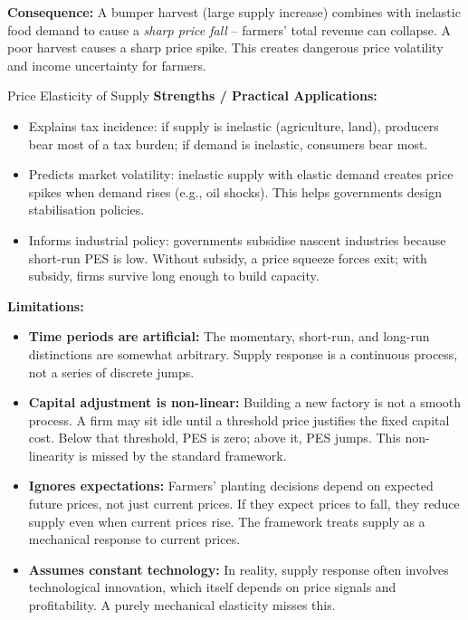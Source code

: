 \documentclass[11pt, a4paper, twoside]{book}
\begin{document}
\textbf{Consequence:} A bumper harvest (large supply increase) combines with inelastic food demand to cause a \emph{sharp price fall} -- farmers' total revenue can collapse. A poor harvest causes a sharp price spike. This creates dangerous price volatility and income uncertainty for farmers.

\begin{evaluation}{Price Elasticity of Supply}
\textbf{Strengths / Practical Applications:}
\begin{itemize}[leftmargin=*, nosep]
\item Explains tax incidence: if supply is inelastic (agriculture, land), producers bear most of a tax burden; if demand is inelastic, consumers bear most.
\item Predicts market volatility: inelastic supply with elastic demand creates price spikes when demand rises (e.g., oil shocks). This helps governments design stabilisation policies.
\item Informs industrial policy: governments subsidise nascent industries because short-run PES is low. Without subsidy, a price squeeze forces exit; with subsidy, firms survive long enough to build capacity.
\end{itemize}

\textbf{Limitations:}
\begin{itemize}[leftmargin=*, nosep]
\item \textbf{Time periods are artificial:} The momentary, short-run, and long-run distinctions are somewhat arbitrary. Supply response is a continuous process, not a series of discrete jumps.
\item \textbf{Capital adjustment is non-linear:} Building a new factory is not a smooth process. A firm may sit idle until a threshold price justifies the fixed capital cost. Below that threshold, PES is zero; above it, PES jumps. This non-linearity is missed by the standard framework.
\item \textbf{Ignores expectations:} Farmers' planting decisions depend on expected future prices, not just current prices. If they expect prices to fall, they reduce supply even when current prices rise. The framework treats supply as a mechanical response to current prices.
\item \textbf{Assumes constant technology:} In reality, supply response often involves technological innovation, which itself depends on price signals and profitability. A purely mechanical elasticity misses this.
\end{itemize}


\end{evaluation}
\end{document}
